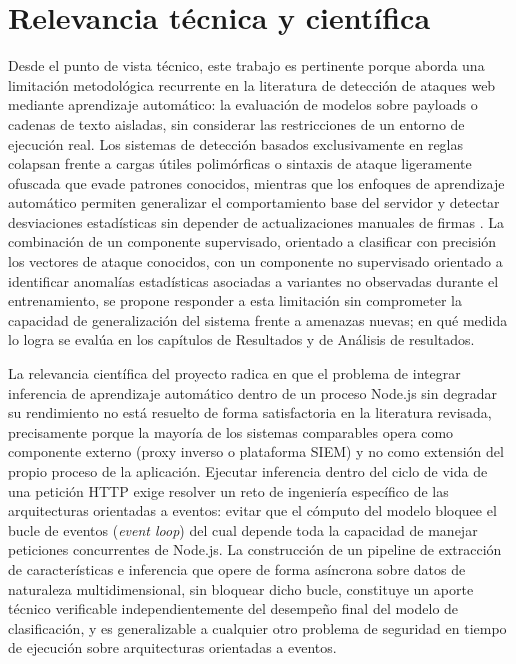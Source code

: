 \section{Relevancia técnica y científica}
Desde el punto de vista técnico, este trabajo es pertinente porque aborda una limitación
metodológica recurrente en la literatura de detección de ataques web mediante aprendizaje
automático: la evaluación de modelos sobre payloads o cadenas de texto aisladas, sin considerar
las restricciones de un entorno de ejecución real. Los sistemas de detección basados
exclusivamente en reglas colapsan frente a cargas útiles polimórficas o sintaxis de ataque
ligeramente ofuscada que evade patrones conocidos, mientras que los enfoques de aprendizaje
automático permiten generalizar el comportamiento base del servidor y detectar desviaciones
estadísticas sin depender de actualizaciones manuales de firmas \cite{zhen2025anomaly}. La combinación
de un componente supervisado, orientado a clasificar con precisión los vectores de ataque
conocidos, con un componente no supervisado orientado a identificar anomalías estadísticas
asociadas a variantes no observadas durante el entrenamiento, se propone responder a esta limitación sin comprometer la capacidad de generalización del sistema frente a amenazas nuevas; en qué medida lo logra se evalúa en los capítulos de Resultados y de Análisis de resultados.

La relevancia científica del proyecto radica en que el problema de integrar inferencia de
aprendizaje automático dentro de un proceso Node.js sin degradar su rendimiento no está resuelto
de forma satisfactoria en la literatura revisada, precisamente porque la mayoría de los sistemas
comparables opera como componente externo (proxy inverso o plataforma SIEM) y no como
extensión del propio proceso de la aplicación. Ejecutar inferencia dentro del ciclo de vida de una
petición HTTP exige resolver un reto de ingeniería específico de las arquitecturas orientadas a
eventos: evitar que el cómputo del modelo bloquee el bucle de eventos (\textit{event loop}) del cual
depende toda la capacidad de manejar peticiones concurrentes de Node.js. La construcción de un
pipeline de extracción de características e inferencia que opere de forma asíncrona sobre datos de
naturaleza multidimensional, sin bloquear dicho bucle, constituye un aporte técnico verificable
independientemente del desempeño final del modelo de clasificación, y es generalizable a
cualquier otro problema de seguridad en tiempo de ejecución sobre arquitecturas orientadas a
eventos.

